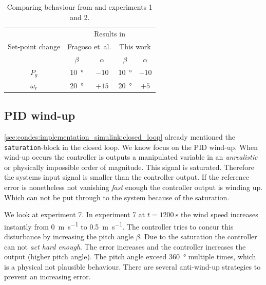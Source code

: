 \begin{table}[H]
    \caption{Comparing behaviour from \cite{Fragoso_et_al_2017} and experiments 1 and 2.}
    \centering
    \begin{tabular}{ccccc} \toprule
        & \multicolumn{4}{c}{Results in } \\
        Set-point change & \multicolumn{2}{c}{Fragoso et~al.} & \multicolumn{2}{c}{This work} \\
        & $\beta$ & $\alpha$& $\beta$ & $\alpha$ \\ \midrule
        $P_g$ & \SI[retain-explicit-plus]{+10}{\degree} & $-10$ & \SI[retain-explicit-plus]{+10}{\degree} & $-10$ \\
        $\omega_r$ & \SI[retain-explicit-plus]{+20}{\degree} & $+15$ & \SI[retain-explicit-plus]{+20}{\degree}& $+5$\\ \bottomrule
    \end{tabular}
    \label{tab:condes:results:benchmark_changes}
\end{table}


\subsection{PID wind-up}

\autoref{sec:condes:implementation_simulink:closed_loop} already mentioned the \texttt{saturation}-block in the closed loop.
We know focus on the PID wind-up.
When wind-up occurs the controller is outputs a manipulated variable in an \textit{unrealistic} or physically impossible order of magnitude.
This signal is saturated.
Therefore the systems input signal is smaller than the controller output.
If the reference error is nonetheless not vanishing \textit{fast} enough the controller output is winding up.
Which can not be put through to the system because of the saturation.

We look at experiment 7.
In experiment 7 at $t=\SI{1200}{\second}$ the wind speed increases instantly from \SI{0}{\metre\per\second} to \SI{0.5}{\metre\per\second}.
The controller tries to concur this disturbance by increasing the pitch angle $\beta$.
Due to the saturation the controller can not \textit{act hard enough}.
The error increases and the controller increases the output (higher pitch angle).
The pitch angle exceed \SI{360}{\degree} multiple times, which is a physical not plausible behaviour.
There are several anti-wind-up strategies to prevent an increasing error.

